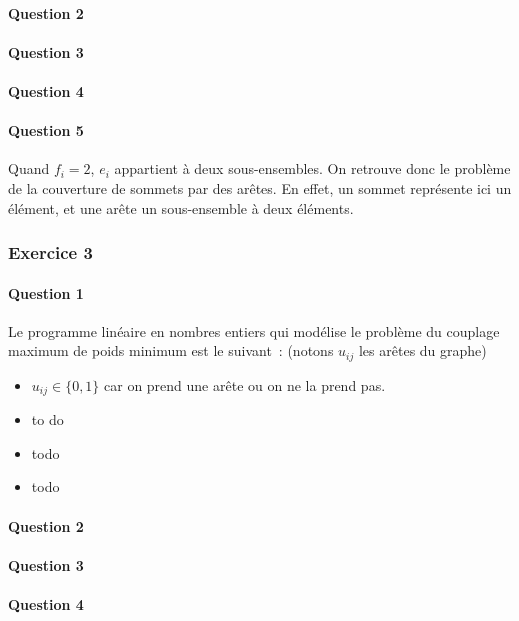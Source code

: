 \documentclass[a4paper, 12pt]{article}
\begin{document}
\paragraph{Question 2}

\paragraph{Question 3}

\paragraph{Question 4}

\paragraph{Question 5}

Quand $f_i = 2$, $e_i$ appartient à deux sous-ensembles. On retrouve
donc le problème de la couverture de sommets par des arêtes. En effet,
un sommet représente ici un élément, et une arête un sous-ensemble à
deux éléments.

\subsubsection*{Exercice 3}

\paragraph{Question 1}Le programme linéaire en nombres entiers qui modélise le
  problème du couplage maximum de poids minimum est le suivant~:
  (notons $u_{ij}$ les arêtes du graphe)
\begin{itemize}
\item $u_{ij} \in \{0, 1\}$ car on prend une arête ou on ne la prend pas.
\item to do
\item todo
\item todo
\end{itemize}

\paragraph{Question 2}
\paragraph{Question 3}
\paragraph{Question 4}
\end{document}
